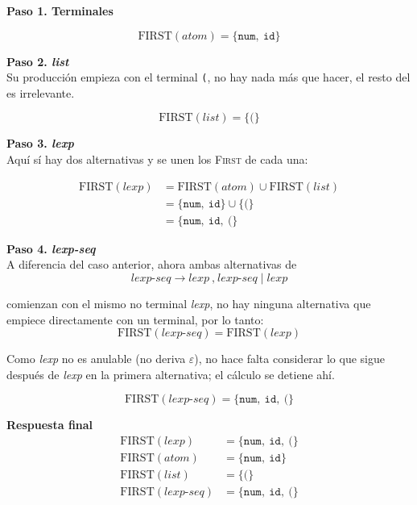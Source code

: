 \documentclass[12pt,letterpaper]{article}
\newcommand{\nt}[1]{\textit{#1}}
\newcommand{\tk}[1]{\texttt{#1}}
\newcommand{\First}[1]{\mathrm{FIRST}(#1)}
\newcommand{\eps}{\varepsilon}
\begin{document}
\begin{enumerate}[label=\arabic*.]
\begin{enumerate}[label=\alph*.]
    \textbf{Paso 1. Terminales}
    
    \[
    \First{\nt{atom}} = \{\tk{num},\ \tk{id}\}
    \]
    
    \textbf{Paso 2. \nt{list}}\\
    Su producción empieza con el terminal \tk{(}, no hay nada más que hacer, el resto del es irrelevante.
    
    \[
    \First{\nt{list}} = \{\tk{(}\}
    \]
    
    \textbf{Paso 3. \nt{lexp}}\\
    Aquí sí hay dos alternativas y se unen los \textsc{First} de cada una:
    
    \[
    \begin{aligned}
      \First{\nt{lexp}}
      &= \First{\nt{atom}} \cup \First{\nt{list}} \\
      &= \{\tk{num},\ \tk{id}\} \cup \{\tk{(}\} \\
      &= \{\tk{num},\ \tk{id},\ \tk{(}\}
    \end{aligned}
    \]
    
    \textbf{Paso 4. \nt{lexp-seq}}\\
    A diferencia del caso anterior, ahora ambas alternativas de
    \[
    \nt{lexp-seq} \to \nt{lexp}\ \tk{,}\ \nt{lexp-seq} \mid \nt{lexp}
    \]
    
    comienzan con el mismo no terminal \nt{lexp}, no hay ninguna alternativa que empiece directamente con un
    terminal, por lo tanto:
    \[
    \First{\nt{lexp-seq}} = \First{\nt{lexp}}
    \]
    
    Como \nt{lexp} no es anulable (no deriva $\eps$), no hace falta considerar lo que sigue después de \nt{lexp}
    en la primera alternativa; el cálculo se detiene ahí.
    
    \[
    \First{\nt{lexp-seq}} = \{\tk{num},\ \tk{id},\ \tk{(}\}
    \]
    
    \textbf{Respuesta final}
    \[
    \begin{aligned}
      \First{\nt{lexp}}     &= \{\tk{num},\ \tk{id},\ \tk{(}\} \\
      \First{\nt{atom}}     &= \{\tk{num},\ \tk{id}\} \\
      \First{\nt{list}}     &= \{\tk{(}\} \\
      \First{\nt{lexp-seq}} &= \{\tk{num},\ \tk{id},\ \tk{(}\}
    \end{aligned}
    \]
    
  \end{enumerate}
  
\end{enumerate}
\end{document}
